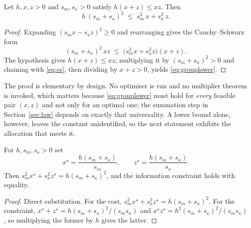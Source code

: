\begin{theorem}
\label{thm:grouplower}
Let $h,x,z>0$ and $s_{m},s_{\kappa}>0$ satisfy $h(x+z)\le xz$. Then
\begin{equation}
h\,(s_{m}+s_{\kappa})^{2} \;\le\; s_{m}^{2}\,x + s_{\kappa}^{2}\,z .
\label{eq:grouplower}
\end{equation}
\end{theorem}

\begin{proof}
Expanding $(s_{m}x-s_{\kappa}z)^{2}\ge0$ and rearranging gives the Cauchy--Schwarz form
\begin{equation}
(s_{m}+s_{\kappa})^{2}\,xz \;\le\; \bigl(s_{m}^{2}x+s_{\kappa}^{2}z\bigr)(x+z).
\label{eq:cs}
\end{equation}
The hypothesis gives $h(x+z)\le xz$; multiplying it by $(s_{m}+s_{\kappa})^{2}>0$ and
chaining with \eqref{eq:cs}, then dividing by $x+z>0$, yields \eqref{eq:grouplower}.
\end{proof}


The proof is elementary by design. No optimiser is run and no multiplier theorem is invoked,
which matters because \eqref{eq:grouplower} must hold for \emph{every} feasible pair
$(x,z)$ and not only for an optimal one; the summation step in
Section~\ref{sec:law} depends on exactly that universality. A lower bound alone, however,
leaves the constant unidentified, so the next statement exhibits the allocation that meets
it.

\begin{theorem}
\label{thm:groupattained}
For $h,s_{m},s_{\kappa}>0$ set
\begin{equation}
x^{\star}=\frac{h(s_{m}+s_{\kappa})}{s_{m}},
\qquad
z^{\star}=\frac{h(s_{m}+s_{\kappa})}{s_{\kappa}} .
\label{eq:groupsplit}
\end{equation}
Then $s_{m}^{2}x^{\star}+s_{\kappa}^{2}z^{\star}=h(s_{m}+s_{\kappa})^{2}$, and the
information constraint holds with equality.
\end{theorem}

\begin{proof}
Direct substitution. For the cost,
$s_{m}^{2}x^{\star}+s_{\kappa}^{2}z^{\star}=h(s_{m}+s_{\kappa})^{2}$. For the constraint,
$x^{\star}+z^{\star}=h(s_{m}+s_{\kappa})^{2}/(s_{m}s_{\kappa})$ and
$x^{\star}z^{\star}=h^{2}(s_{m}+s_{\kappa})^{2}/(s_{m}s_{\kappa})$, so multiplying the
former by $h$ gives the latter.
\end{proof}

